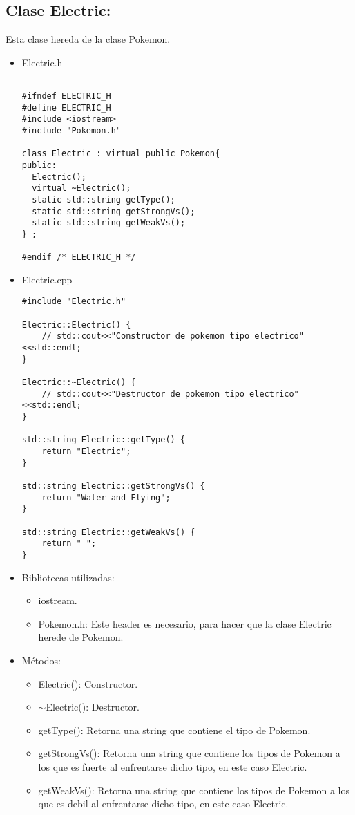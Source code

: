 \documentclass[11pt]{article}
\begin{document}
\subsection{Clase Electric:} 
Esta clase hereda de la clase Pokemon.
\begin{itemize}
\item Electric.h
\begin{lstlisting}

#ifndef ELECTRIC_H
#define ELECTRIC_H
#include <iostream>
#include "Pokemon.h"

class Electric : virtual public Pokemon{
public:
  Electric();
  virtual ~Electric();
  static std::string getType();
  static std::string getStrongVs();
  static std::string getWeakVs();
} ;

#endif /* ELECTRIC_H */
\end{lstlisting}

\item Electric.cpp
\begin{lstlisting}
#include "Electric.h"

Electric::Electric() {
    // std::cout<<"Constructor de pokemon tipo electrico"<<std::endl;
}

Electric::~Electric() {
    // std::cout<<"Destructor de pokemon tipo electrico"<<std::endl;
}

std::string Electric::getType() {
    return "Electric";
}

std::string Electric::getStrongVs() {
    return "Water and Flying";
}

std::string Electric::getWeakVs() {
    return " ";
}

\end{lstlisting}
\item Bibliotecas utilizadas:
\begin{itemize}
\item iostream.
\item Pokemon.h: Este header es necesario, para hacer que la clase Electric herede de Pokemon.
\end{itemize}
\item M\'etodos:
\begin{itemize}
\item Electric(): 
Constructor.
\item $\sim$Electric():
Destructor.
\item getType():
Retorna una string que contiene el tipo de Pokemon.

\item getStrongVs():
Retorna una string que contiene los tipos de Pokemon a los que es fuerte al enfrentarse dicho tipo, en este caso Electric.

\item getWeakVs():
Retorna una string que contiene los tipos de Pokemon a los que es debil al enfrentarse dicho tipo, en este caso Electric.


\end{itemize}
\end{itemize}
\end{document}
